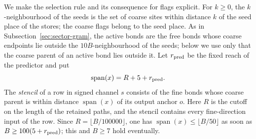 We make the selection rule and its consequence for flags explicit.
For $k\ge0$, the $k$-neighbourhood of the seeds is the set of coarse
sites within distance $k$ of the seed place of the stores; the coarse
flags belong to the seed place. As in Subsection~\ref{sec:sector-gram},
the active bonds are the free bonds whose coarse endpoints lie outside
the $10B$-neighbourhood of the seeds; below we use only that the coarse
parent of an active bond lies outside it. Let $r_{\rm pred}$ be the
fixed reach of the predictor and put
\[
 \operatorname{span}(x)=R+5+r_{\rm pred}.
\]
The \emph{stencil} of a row in signed channel $s$ consists of the fine
bonds whose coarse parent is within distance $\operatorname{span}(x)$
of its output anchor $o$. Here $R$ is the cutoff on the length of the
retained paths, and the stencil contains every fine-direction input of
the row. Since $R=\lfloor B/100000\rfloor$, one has
$\operatorname{span}(x)\le\lfloor B/50\rfloor$ as soon as
$B\ge100(5+r_{\rm pred})$; this and $B\ge7$ hold eventually.

